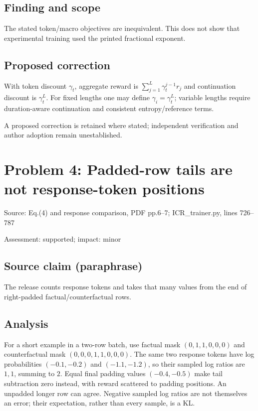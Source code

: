 \documentclass[11pt]{article}
\begin{document}
\subsection*{Finding and scope}

The stated token/macro objectives are inequivalent. This does not show that experimental training used the printed fractional exponent.

\subsection*{Proposed correction}

With token discount \(\gamma_t\), aggregate reward is \(\sum_{j=1}^L\gamma_t^{j-1}r_j\) and continuation discount is \(\gamma_t^L\). For fixed lengths one may define \(\gamma_i=\gamma_t^L\); variable lengths require duration-aware continuation and consistent entropy/reference terms.

A proposed correction is retained where stated; independent verification and author adoption remain unestablished.

\section*{Problem 4: Padded-row tails are not response-token positions}

Source: Eq.(4) and response comparison, PDF pp.6–7; ICR\_trainer.py, lines 726–787

Assessment: supported; impact: minor

\subsection*{Source claim (paraphrase)}

The release counts response tokens and takes that many values from the end of right-padded factual/counterfactual rows.

\subsection*{Analysis}

For a short example in a two-row batch, use factual mask \((0,1,1,0,0,0)\) and counterfactual mask \((0,0,0,1,1,0,0,0)\). The same two response tokens have log probabilities \((-0.1,-0.2)\) and \((-1.1,-1.2)\), so their sampled log ratios are \(1,1\), summing to \(2\). Equal final padding values \((-0.4,-0.5)\) make tail subtraction zero instead, with reward scattered to padding positions. An unpadded longer row can agree. Negative sampled log ratios are not themselves an error; their expectation, rather than every sample, is a KL.
\end{document}
